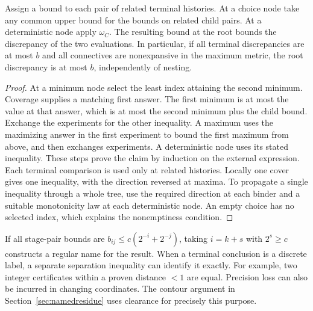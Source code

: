 \begin{theorem}\label{thm:compare}
Assign a bound to each pair of related terminal histories. At a choice node take any common upper bound for the bounds on related child pairs. At a deterministic node apply \(\omega_C\). The resulting bound at the root bounds the discrepancy of the two evaluations. In particular, if all terminal discrepancies are at most \(b\) and all connectives are nonexpansive in the maximum metric, the root discrepancy is at most \(b\), independently of nesting.
\end{theorem}
\begin{proof}
At a minimum node select the least index attaining the second minimum. Coverage supplies a matching first answer. The first minimum is at most the value at that answer, which is at most the second minimum plus the child bound. Exchange the experiments for the other inequality. A maximum uses the maximizing answer in the first experiment to bound the first maximum from above, and then exchanges experiments. A deterministic node uses its stated inequality. These steps prove the claim by induction on the external expression. Each terminal comparison is used only at related histories. Locally one cover gives one inequality, with the direction reversed at maxima. To propagate a single inequality through a whole tree, use the required direction at each binder and a suitable monotonicity law at each deterministic node. An empty choice has no selected index, which explains the nonemptiness condition.
\end{proof}

If all stage-pair bounds are \(b_{ij}\le c(2^{-i}+2^{-j})\), taking \(i=k+s\) with \(2^s\ge c\) constructs a regular name for the result. When a terminal conclusion is a discrete label, a separate separation inequality can identify it exactly. For example, two integer certificates within a proven distance \(<1\) are equal. Precision loss can also be incurred in changing coordinates. The contour argument in Section~\ref{sec:namedresidue} uses clearance for precisely this purpose.

